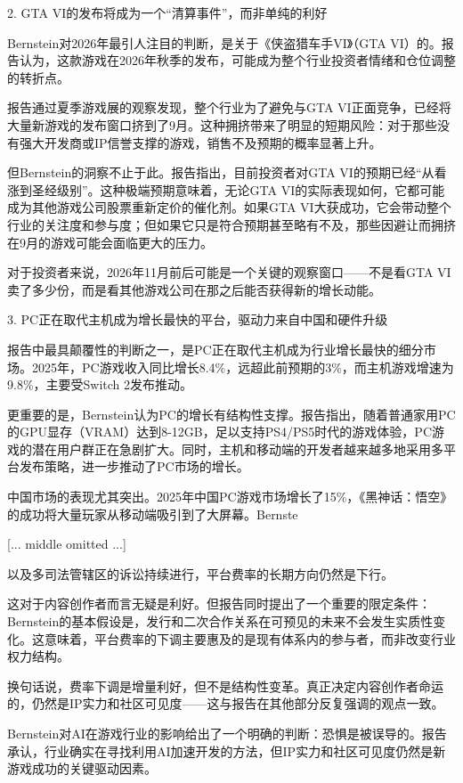 \documentclass[11pt]{ctexart}
\begin{document}
2. GTA VI的发布将成为一个“清算事件”，而非单纯的利好

Bernstein对2026年最引人注目的判断，是关于《侠盗猎车手VI》（GTA VI）的。报告认为，这款游戏在2026年秋季的发布，可能成为整个行业投资者情绪和仓位调整的转折点。

报告通过夏季游戏展的观察发现，整个行业为了避免与GTA VI正面竞争，已经将大量新游戏的发布窗口挤到了9月。这种拥挤带来了明显的短期风险：对于那些没有强大开发商或IP信誉支撑的游戏，销售不及预期的概率显著上升。

但Bernstein的洞察不止于此。报告指出，目前投资者对GTA VI的预期已经“从看涨到圣经级别”。这种极端预期意味着，无论GTA VI的实际表现如何，它都可能成为其他游戏公司股票重新定价的催化剂。如果GTA VI大获成功，它会带动整个行业的关注度和参与度；但如果它只是符合预期甚至略有不及，那些因避让而拥挤在9月的游戏可能会面临更大的压力。

对于投资者来说，2026年11月前后可能是一个关键的观察窗口——不是看GTA VI卖了多少份，而是看其他游戏公司在那之后能否获得新的增长动能。

3. PC正在取代主机成为增长最快的平台，驱动力来自中国和硬件升级

报告中最具颠覆性的判断之一，是PC正在取代主机成为行业增长最快的细分市场。2025年，PC游戏收入同比增长8.4\%，远超此前预期的3\%，而主机游戏增速为9.8\%，主要受Switch 2发布推动。

更重要的是，Bernstein认为PC的增长有结构性支撑。报告指出，随着普通家用PC的GPU显存（VRAM）达到8-12GB，足以支持PS4/PS5时代的游戏体验，PC游戏的潜在用户群正在急剧扩大。同时，主机和移动端的开发者越来越多地采用多平台发布策略，进一步推动了PC市场的增长。

中国市场的表现尤其突出。2025年中国PC游戏市场增长了15\%，《黑神话：悟空》的成功将大量玩家从移动端吸引到了大屏幕。Bernste

[... middle omitted ...]

以及多司法管辖区的诉讼持续进行，平台费率的长期方向仍然是下行。

这对于内容创作者而言无疑是利好。但报告同时提出了一个重要的限定条件：Bernstein的基本假设是，发行和二次合作关系在可预见的未来不会发生实质性变化。这意味着，平台费率的下调主要惠及的是现有体系内的参与者，而非改变行业权力结构。

换句话说，费率下调是增量利好，但不是结构性变革。真正决定内容创作者命运的，仍然是IP实力和社区可见度——这与报告在其他部分反复强调的观点一致。

Bernstein对AI在游戏行业的影响给出了一个明确的判断：恐惧是被误导的。报告承认，行业确实在寻找利用AI加速开发的方法，但IP实力和社区可见度仍然是新游戏成功的关键驱动因素。
\end{document}
